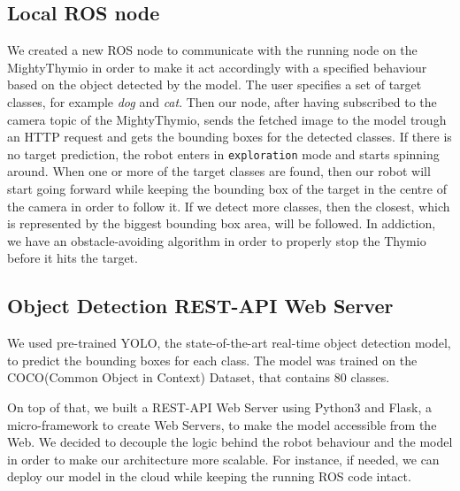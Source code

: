 \documentclass[letterpaper, 10 pt, conference]{ieeeconf}  %
\begin{document}
\subsection*{Local ROS node}
We created a new ROS node to communicate with the running node on the MightyThymio in order to make it act accordingly with a specified behaviour based on the object detected by the model. The user specifies a set of target classes, for example \emph{dog} and \emph{cat}. Then our node, after having subscribed to the camera topic of the MightyThymio, sends the fetched image to the model trough an HTTP request and gets the bounding boxes for the detected classes. If there is no target prediction, the robot enters in \texttt{exploration} mode and starts spinning around. When one or more of the target classes are found, then our robot will start going forward while keeping the bounding box of the target in the centre of the camera in order to follow it. If we detect more classes, then the closest, which is represented by the biggest bounding box area, will be followed. In addiction, we have an obstacle-avoiding algorithm in order to properly stop the Thymio before it hits the target.

\subsection*{Object Detection REST-API Web Server}
We used pre-trained YOLO\cite{DBLP:conf/cvpr/RedmonDGF16}, the state-of-the-art real-time object detection model, to predict the bounding boxes for each class. The model was trained on the COCO(Common Object in Context)\cite{COCO} Dataset, that contains 80 classes. 

On top of that, we built a REST-API Web Server using Python3 and Flask, a micro-framework to create Web Servers, to make the model accessible from the Web. We decided to decouple the logic behind the robot behaviour and the model in order to make our architecture more scalable. For instance, if needed, we can deploy our model in the cloud while keeping the running ROS code intact. 
\end{document}
